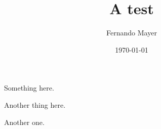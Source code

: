 \documentclass[a4paper]{article}
\title{A test}
\author{Fernando Mayer}
\date{\today}
\begin{document}
\maketitle

Something here.

Another thing here.

Another one.
\end{document}

